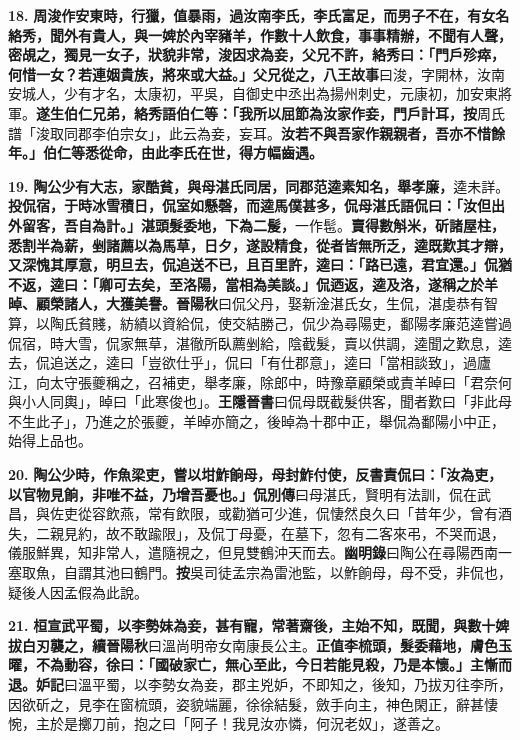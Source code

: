 \textbf{18.} \textbf{周浚作安東時，行獵，值暴雨，過汝南李氏，李氏富足，而男子不在，有女名絡秀，聞外有貴人，與一婢於內宰豬羊，作數十人飲食，事事精辦，不聞有人聲，密覘之，獨見一女子，狀貌非常，浚因求為妾，父兄不許，絡秀曰：「門戶殄瘁，何惜一女？若連姻貴族，將來或大益。」父兄從之，}{\footnotesize \textbf{八王故事}曰浚，字開林，汝南安城人，少有才名，太康初，平吳，自御史中丞出為揚州刺史，元康初，加安東將軍。}\textbf{遂生伯仁兄弟，絡秀語伯仁等：「我所以屈節為汝家作妾，門戶計耳，}{\footnotesize \textbf{按}周氏譜「浚取同郡李伯宗女」，此云為妾，妄耳。}\textbf{汝若不與吾家作親親者，吾亦不惜餘年。」伯仁等悉從命，由此李氏在世，得方幅齒遇。}

\textbf{19.} \textbf{陶公少有大志，家酷貧，與母湛氏同居，同郡范逵素知名，舉孝廉，}{\footnotesize 逵未詳。}\textbf{投侃宿，于時冰雪積日，侃室如懸磬，而逵馬僕甚多，侃母湛氏語侃曰：「汝但出外留客，吾自為計。」湛頭髮委地，下為二髲，}{\footnotesize 一作髢。}\textbf{賣得數斛米，斫諸屋柱，悉割半為薪，剉諸薦以為馬草，日夕，遂設精食，從者皆無所乏，逵既歎其才辯，又深愧其厚意，明旦去，侃追送不已，且百里許，逵曰：「路已遠，君宜還。」侃猶不返，逵曰：「卿可去矣，至洛陽，當相為美談。」侃迺返，逵及洛，遂稱之於羊晫、顧榮諸人，大獲美譽。}{\footnotesize \textbf{晉陽秋}曰侃父丹，娶新淦湛氏女，生侃，湛虔恭有智算，以陶氏貧賤，紡績以資給侃，使交結勝己，侃少為尋陽吏，鄱陽孝廉范逵嘗過侃宿，時大雪，侃家無草，湛徹所臥薦剉給，陰截髮，賣以供調，逵聞之歎息，逵去，侃追送之，逵曰「豈欲仕乎」，侃曰「有仕郡意」，逵曰「當相談致」，過廬江，向太守張夔稱之，召補吏，舉孝廉，除郎中，時豫章顧榮或責羊晫曰「君奈何與小人同輿」，晫曰「此寒俊也」。\textbf{王隱晉書}曰侃母既截髮供客，聞者歎曰「非此母不生此子」，乃進之於張夔，羊晫亦簡之，後晫為十郡中正，舉侃為鄱陽小中正，始得上品也。}

\textbf{20.} \textbf{陶公少時，作魚梁吏，嘗以坩鮓餉母，母封鮓付使，反書責侃曰：「汝為吏，以官物見餉，非唯不益，乃增吾憂也。」}{\footnotesize \textbf{侃別傳}曰母湛氏，賢明有法訓，侃在武昌，與佐吏從容飲燕，常有飲限，或勸猶可少進，侃悽然良久曰「昔年少，曾有酒失，二親見約，故不敢踰限」，及侃丁母憂，在墓下，忽有二客來弔，不哭而退，儀服鮮異，知非常人，遣隨視之，但見雙鶴沖天而去。\textbf{幽明錄}曰陶公在尋陽西南一塞取魚，自謂其池曰鶴門。\textbf{按}吳司徒孟宗為雷池監，以鮓餉母，母不受，非侃也，疑後人因孟假為此說。}

\textbf{21.} \textbf{桓宣武平蜀，以李勢妹為妾，甚有寵，常著齋後，主始不知，既聞，與數十婢拔白刃襲之，}{\footnotesize \textbf{續晉陽秋}曰溫尚明帝女南康長公主。}\textbf{正值李梳頭，髮委藉地，膚色玉曜，不為動容，徐曰：「國破家亡，無心至此，今日若能見殺，乃是本懷。」主慚而退。}{\footnotesize \textbf{妒記}曰溫平蜀，以李勢女為妾，郡主兇妒，不即知之，後知，乃拔刃往李所，因欲斫之，見李在窗梳頭，姿貌端麗，徐徐結髮，斂手向主，神色閑正，辭甚悽惋，主於是擲刀前，抱之曰「阿子！我見汝亦憐，何況老奴」，遂善之。}

